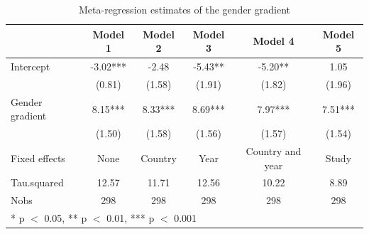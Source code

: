 \begin{table}
\centering
\caption{Meta-regression estimates of the gender gradient}
\centering
\begin{tabular}[t]{lccccc}
\toprule
  & Model 1 & Model 2 & Model 3 & Model 4 & Model 5\\
\midrule
Intercept & -3.02*** & -2.48 & -5.43** & -5.20** & 1.05\\
 & (0.81) & (1.58) & (1.91) & (1.82) & (1.96)\\
Gender gradient & 8.15*** & 8.33*** & 8.69*** & 7.97*** & 7.51***\\
 & (1.50) & (1.58) & (1.56) & (1.57) & (1.54)\\
\midrule
Fixed effects & None & Country & Year & Country and year & Study\\
Tau.squared & 12.57 & 11.71 & 12.56 & 10.22 & 8.89\\
Nobs & 298 & 298 & 298 & 298 & 298\\
\bottomrule
\multicolumn{6}{l}{\rule{0pt}{1em}* p $<$ 0.05, ** p $<$ 0.01, *** p $<$ 0.001}\\
\end{tabular}
\end{table}

